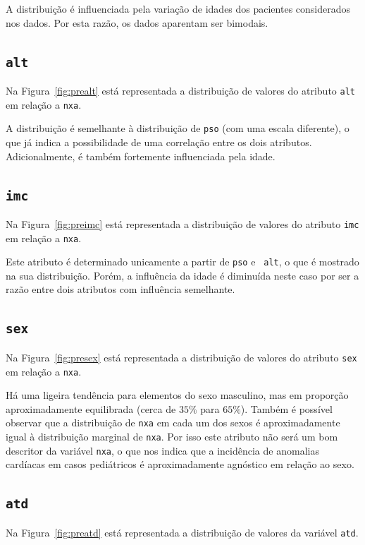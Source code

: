 \documentclass[10pt, conference, compsocconf]{IEEEtran}
\begin{document}

A distribuição é influenciada pela variação de idades dos pacientes
considerados nos dados. Por esta razão, os dados aparentam ser
bimodais.

\subsection{\texttt{alt}}
Na Figura~\ref{fig:prealt} está representada a distribuição de valores
do atributo {\tt alt} em relação a {\tt nxa}.


A distribuição é semelhante à distribuição de {\tt pso} (com uma
escala diferente), o que já indica a possibilidade de uma correlação
entre os dois atributos. Adicionalmente, é também fortemente
influenciada pela idade.

\subsection{\texttt{imc}}
Na Figura~\ref{fig:preimc} está representada a distribuição de valores
do atributo {\tt imc} em relação a {\tt nxa}.


Este atributo é determinado unicamente a partir de {\tt pso} e {\tt
  alt}, o que é mostrado na sua distribuição. Porém, a influência da
idade é diminuída neste caso por ser a razão entre dois atributos com
influência semelhante.

\subsection{\texttt{sex}}
Na Figura~\ref{fig:presex} está representada a distribuição de valores
do atributo {\tt sex} em relação a {\tt nxa}.


Há uma ligeira tendência para elementos do sexo masculino, mas em
proporção aproximadamente equilibrada (cerca de $35\%$ para
$65\%$). Também é possível observar que a distribuição de {\tt nxa} em
cada um dos sexos é aproximadamente igual à distribuição marginal de
{\tt nxa}. Por isso este atributo não será um bom descritor da
variável {\tt nxa}, o que nos indica que a incidência de anomalias
cardíacas em casos pediátricos é aproximadamente agnóstico em relação
ao sexo.

\subsection{\texttt{atd}}
Na Figura~\ref{fig:preatd} está representada a distribuição de valores
da variável {\tt atd}.
\end{document}
